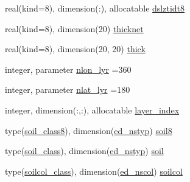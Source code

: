 \begin{DoxyCompactItemize}
real(kind=8), dimension(\+:), allocatable \hyperlink{namespacesoil__coms_aed792678a3757670fef365202ee15c39}{dslztidt8}
\item 
real(kind=8), dimension(20) \hyperlink{namespacesoil__coms_a82fb9ea0980b1bf483abde43cb04cbd3}{thicknet}
\item 
real(kind=8), dimension(20, 20) \hyperlink{namespacesoil__coms_a5e41e535957c9e40c2836496d007477f}{thick}
\item 
integer, parameter \hyperlink{namespacesoil__coms_a8430352c5e4200574649e445fbe0e682}{nlon\+\_\+lyr} =360
\item 
integer, parameter \hyperlink{namespacesoil__coms_ab0f3f3665b8b408861fcded1094fa91c}{nlat\+\_\+lyr} =180
\item 
integer, dimension(\+:,\+:), allocatable \hyperlink{namespacesoil__coms_a09e8408810b16557b7bcc84cd165645a}{layer\+\_\+index}
\item 
type(\hyperlink{structsoil__coms_1_1soil__class8}{soil\+\_\+class8}), dimension(\hyperlink{namespacesoil__coms_a354035bf03f4bb65c1636100aa6737e8}{ed\+\_\+nstyp}) \hyperlink{namespacesoil__coms_a5d71d43e3458fde6c6f89d29af5225c8}{soil8}
\item 
type(\hyperlink{structsoil__coms_1_1soil__class}{soil\+\_\+class}), dimension(\hyperlink{namespacesoil__coms_a354035bf03f4bb65c1636100aa6737e8}{ed\+\_\+nstyp}) \hyperlink{namespacesoil__coms_a18bef58fe90e83fad032983a8e079a60}{soil}
\item 
type(\hyperlink{structsoil__coms_1_1soilcol__class}{soilcol\+\_\+class}), dimension(\hyperlink{namespacesoil__coms_a359b4988ce0556dd6f2138752c38d3dc}{ed\+\_\+nscol}) \hyperlink{namespacesoil__coms_a90e160d33d6fa2c289ce1742bc852139}{soilcol}
\item 

\end{DoxyCompactItemize}
